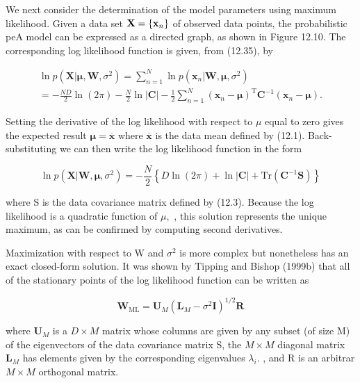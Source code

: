 \documentclass[
  10
]{article}
\begin{document}
We next consider the determination of the model parameters using maximum
likelihood. Given a data set \({ \bf X } = \{ { \bf x } _ { n } \}\) of
observed data points, the probabilistic peA model can be expressed as a
directed graph, as shown in Figure 12.10. The corresponding log
likelihood function is given, from (12.35), by

\[
\begin{array}{l} \ln p (\mathbf {X} | \boldsymbol {\mu}, \mathbf {W}, \sigma^ {2}) = \sum_ {n = 1} ^ {N} \ln p (\mathbf {x} _ {n} | \mathbf {W}, \boldsymbol {\mu}, \sigma^ {2}) \\ = - \frac {N D}{2} \ln (2 \pi) - \frac {N}{2} \ln | \mathbf {C} | - \frac {1}{2} \sum_ {n = 1} ^ {N} (\mathbf {x} _ {n} - \boldsymbol {\mu}) ^ {\mathrm{T}} \mathbf {C} ^ {- 1} (\mathbf {x} _ {n} - \boldsymbol {\mu}). \end{array}\tag{12.43}
\]

Setting the derivative of the log likelihood with respect to \(\mu\)
equal to zero gives the expected result
\({ \pmb \mu } = \overline { { \mathbf { x } } }\) where
\(\overline { { \mathbf { x } } }\) is the data mean defined by (12.1).
Back-substituting we can then write the log likelihood function in the
form

\[
\ln p (\mathbf {X} | \mathbf {W}, \pmb {\mu}, \sigma^ {2}) = - \frac {N}{2} \left\{D \ln (2 \pi) + \ln | \mathbf {C} | + \mathrm{Tr} \left(\mathbf {C} ^ {- 1} \mathbf {S}\right) \right\}\tag{12.44}
\]

where S is the data covariance matrix defined by (12.3). Because the log
likelihood is a quadratic function of \(\mu ,\) , this solution
represents the unique maximum, as can be confirmed by computing second
derivatives.

Maximization with respect to W and \(\sigma ^ { 2 }\) is more complex
but nonetheless has an exact closed-form solution. It was shown by
Tipping and Bishop (1999b) that all of the stationary points of the log
likelihood function can be written as

\[
\mathbf {W} _ {\mathrm{ML}} = \mathbf {U} _ {M} (\mathbf {L} _ {M} - \sigma^ {2} \mathbf {I}) ^ {1 / 2} \mathbf {R}\tag{12.45}
\]

where \(\mathbf { U } _ { M }\) is a \(D \times M\) matrix whose columns
are given by any subset (of size M) of the eigenvectors of the data
covariance matrix S, the \(M \times M\) diagonal matrix
\(\mathbf { L } _ { M }\) has elements given by the corresponding
eigenvalues \(\lambda _ { i } .\) , and R is an arbitrar \(M \times M\)
orthogonal matrix.
\end{document}
